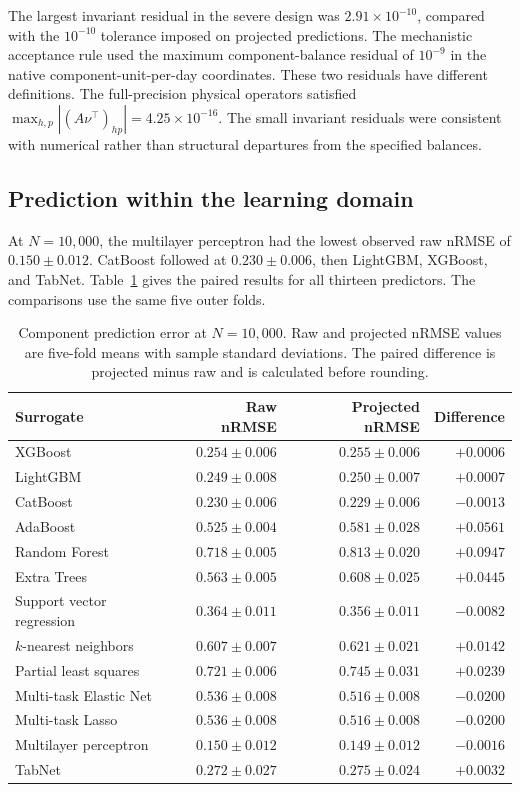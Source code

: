 The largest invariant residual in the severe design was $2.91\times10^{-10}$, compared with the $10^{-10}$ tolerance imposed on projected predictions. The mechanistic acceptance rule used the maximum component-balance residual of $10^{-9}$ in the native component-unit-per-day coordinates. These two residuals have different definitions. The full-precision physical operators satisfied $\max_{h,p}|(A\nu^\top)_{hp}|=4.25\times10^{-16}$. The small invariant residuals were consistent with numerical rather than structural departures from the specified balances.

\subsection{Prediction within the learning domain}

At $N=10{,}000$, the multilayer perceptron had the lowest observed raw nRMSE of $0.150\pm0.012$. CatBoost followed at $0.230\pm0.006$, then LightGBM, XGBoost, and TabNet. Table~\ref{tab:projection_prediction_results} gives the paired results for all thirteen predictors. The comparisons use the same five outer folds.

\begin{table}[htbp]
\centering\small
\caption{Component prediction error at $N=10{,}000$. Raw and projected nRMSE values are five-fold means with sample standard deviations. The paired difference is projected minus raw and is calculated before rounding.}
\label{tab:projection_prediction_results}
\begin{tabular}{p{4.7cm}rrr}
\toprule
Surrogate & Raw nRMSE & Projected nRMSE & Difference\\
\midrule
XGBoost & $0.254\pm0.006$ & $0.255\pm0.006$ & $+0.0006$\\
LightGBM & $0.249\pm0.008$ & $0.250\pm0.007$ & $+0.0007$\\
CatBoost & $0.230\pm0.006$ & $0.229\pm0.006$ & $-0.0013$\\
AdaBoost & $0.525\pm0.004$ & $0.581\pm0.028$ & $+0.0561$\\
Random Forest & $0.718\pm0.005$ & $0.813\pm0.020$ & $+0.0947$\\
Extra Trees & $0.563\pm0.005$ & $0.608\pm0.025$ & $+0.0445$\\
Support vector regression & $0.364\pm0.011$ & $0.356\pm0.011$ & $-0.0082$\\
$k$-nearest neighbors & $0.607\pm0.007$ & $0.621\pm0.021$ & $+0.0142$\\
Partial least squares & $0.721\pm0.006$ & $0.745\pm0.031$ & $+0.0239$\\
Multi-task Elastic Net & $0.536\pm0.008$ & $0.516\pm0.008$ & $-0.0200$\\
Multi-task Lasso & $0.536\pm0.008$ & $0.516\pm0.008$ & $-0.0200$\\
Multilayer perceptron & $0.150\pm0.012$ & $0.149\pm0.012$ & $-0.0016$\\
TabNet & $0.272\pm0.027$ & $0.275\pm0.024$ & $+0.0032$\\
\bottomrule
\end{tabular}
\end{table}

